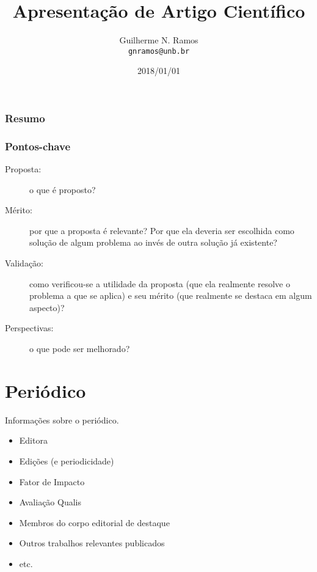 \documentclass{UnBeamer}%
\title[Resumo]{Apresentação de Artigo Científico}%
\author[gnramos]{Guilherme N. Ramos\\%
                 \texttt{gnramos@unb.br}}%
\institute[PPCA/CIC]{Departamento de Ciência da Computação\\%
                     Universidade de Brasília}%
\date[2018]{2018/01/01}%
\begin{document}
%
    \frame{\titlepage}%

    \begin{frame}%
        \frametitle{Resumo}%
        \tableofcontents%
    \end{frame}%

    \begin{frame}%
        \frametitle{Pontos-chave}%

        \begin{description}
            \item[Proposta:] o que é proposto?\vfill%
            \item[Mérito:] por que a proposta é relevante? Por que ela deveria ser escolhida como solução de algum problema ao invés de outra solução já existente?\vfill%
            \item[Validação:] como verificou-se a utilidade da proposta (que ela realmente resolve o problema a que se aplica) e seu mérito (que realmente se destaca em algum aspecto)?\vfill%
            \item[Perspectivas:] o que pode ser melhorado?%
        \end{description}%
    \end{frame}%

    \section{Periódico}
    \begin{frame}%
        Informações sobre o periódico.%
        \begin{itemize}%
            \item Editora%
            \item Edições (e periodicidade)%
            \item Fator de Impacto%
            \item Avaliação Qualis%
            \item Membros do corpo editorial de destaque%
            \item Outros trabalhos relevantes publicados%
            \item etc.%
        \end{itemize}%
    \end{frame}%
\end{document}
